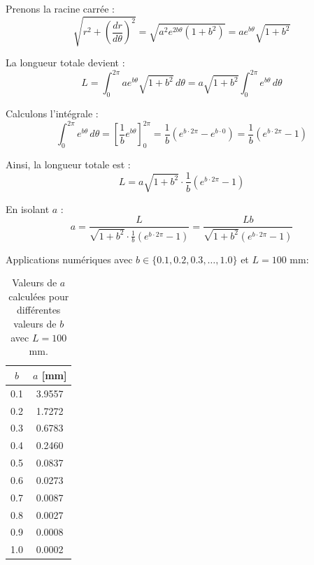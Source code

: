 \documentclass[a4paper, 11pt]{report}
\begin{document}
            Prenons la racine carrée :
            \[
            \sqrt{r^2 + \left( \frac{dr}{d\theta} \right)^2} = \sqrt{a^2 e^{2b \theta} (1 + b^2)} = a e^{b \theta} \sqrt{1 + b^2}
            \]
            
            La longueur totale devient :
            \[
            L = \int_0^{2\pi} a e^{b \theta} \sqrt{1 + b^2} \, d\theta = a \sqrt{1 + b^2} \int_0^{2\pi} e^{b \theta} \, d\theta
            \]
            
            Calculons l'intégrale :
            \[
            \int_0^{2\pi} e^{b \theta} \, d\theta = \left[ \frac{1}{b} e^{b \theta} \right]_0^{2\pi} = \frac{1}{b} \left( e^{b \cdot 2\pi} - e^{b \cdot 0} \right) = \frac{1}{b} \left( e^{b \cdot 2\pi} - 1 \right)
            \]
            
            Ainsi, la longueur totale est :
            \[
            L = a \sqrt{1 + b^2} \cdot \frac{1}{b} \left( e^{b \cdot 2\pi} - 1 \right)
            \]
            
            En isolant \( a \) :
            \[
            a = \frac{L}{\sqrt{1 + b^2} \cdot \frac{1}{b} \left( e^{b \cdot 2\pi} - 1 \right)} = \frac{L b}{\sqrt{1 + b^2} \left( e^{b \cdot 2\pi} - 1 \right)}
            \]
            
            Applications numériques avec \( b \in \{0.1, 0.2, 0.3, \dots, 1.0\} \) et \( L = 100 \) mm:

            \begin{table}[h!]
                \centering
                \begin{tabular}{@{}c S[table-format=1.4]@{}}
                \toprule
                $b$ & {$a$ [mm]} \\
                 & 3.9557 \\
                0.2 & 1.7272 \\
                0.3 & 0.6783 \\
                0.4 & 0.2460 \\
                0.5 & 0.0837 \\
                0.6 & 0.0273 \\
                0.7 & 0.0087 \\
                0.8 & 0.0027 \\
                0.9 & 0.0008 \\
                1.0 & 0.0002 \\
                \bottomrule
                \end{tabular}
                \caption{Valeurs de $a$ calculées pour différentes valeurs de $b$ avec $L=100$ mm.}
            \end{table}
\end{document}
